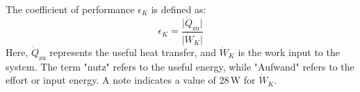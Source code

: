 The coefficient of performance \( \epsilon_K \) is defined as:  
\[
\epsilon_K = \frac{\lvert \dot{Q}_{\text{zu}} \rvert}{\lvert \dot{W}_K \rvert}
\]  
Here, \( \dot{Q}_{\text{zu}} \) represents the useful heat transfer, and \( \dot{W}_K \) is the work input to the system. The term "nutz" refers to the useful energy, while "Aufwand" refers to the effort or input energy. A note indicates a value of \( 28 \, \text{W} \) for \( \dot{W}_K \).